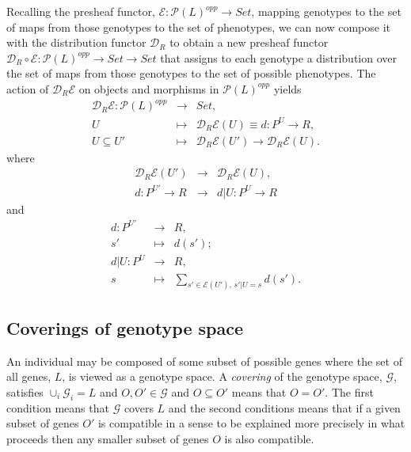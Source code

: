 \documentclass[10pt]{article}
\begin{document}
Recalling the presheaf functor, $\mathcal{E} \colon \mathcal{P}(L)^{opp} \rightarrow Set$, mapping genotypes to the set of maps from those genotypes to the set of phenotypes, we can now compose it with the distribution functor $\mathcal{D}_R$ to obtain a new presheaf functor $\mathcal{D}_R \circ \mathcal{E} \colon \mathcal{P}(L)^{opp} \rightarrow Set \rightarrow Set$ that assigns to each genotype a distribution over the set of maps from those genotypes to the set of possible phenotypes. The action of $\mathcal{D}_R \mathcal{E}$ on objects and morphisms in $\mathcal{P}(L)^{opp}$ yields
\begin{eqnarray*}
\mathcal{D}_R \mathcal{E} \colon \mathcal{P}(L)^{opp} &\rightarrow& Set,\\
U &\mapsto& \mathcal{D}_R \mathcal{E}(U) \equiv d \colon P^U \rightarrow R,\\
U \subseteq U' &\mapsto& \mathcal{D}_R \mathcal{E}(U') \rightarrow \mathcal{D}_R \mathcal{E}(U).
\end{eqnarray*}
where
\begin{eqnarray*}
\mathcal{D}_R \mathcal{E}(U') &\rightarrow& \mathcal{D}_R \mathcal{E}(U),\\
d \colon P^{U'} \rightarrow R &\rightarrow& d|U \colon P^{U} \rightarrow R
\end{eqnarray*}
and
\begin{eqnarray*}
d \colon P^{U'} &\rightarrow& R,\\
s' &\mapsto& d(s');\\
d|U \colon P^{U} &\rightarrow& R,\\
s &\mapsto& \sum_{s' \in \mathcal{E}(U'),\, s'|U=s} d(s').
\end{eqnarray*}

\subsection*{Coverings of genotype space}
An individual may be composed of some subset of possible genes where the set of all genes, $L$, is viewed as a genotype space. A \emph{covering} of the genotype space, $\mathcal{G}$, satisfies $\cup_i \mathcal{G}_i = L$ and $O,O' \in \mathcal{G}$ and $O \subseteq O'$ means that $O = O'$. The first condition means that $\mathcal{G}$ covers $L$ and the second conditions means that if a given subset of genes $O'$ is compatible in a sense to be explained more precisely in what proceeds then any smaller subset of genes $O$ is also compatible.
\end{document}
